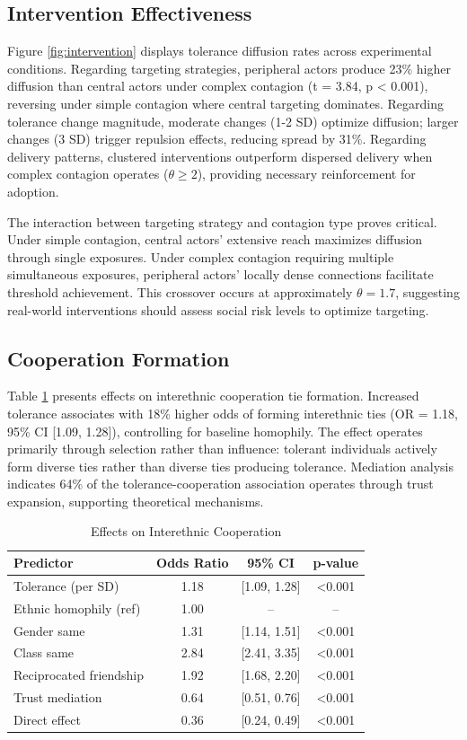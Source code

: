 \documentclass[12pt,a4paper]{article}
\begin{document}
\subsection{Intervention Effectiveness}

Figure \ref{fig:intervention} displays tolerance diffusion rates across experimental conditions. Regarding targeting strategies, peripheral actors produce 23\% higher diffusion than central actors under complex contagion (t = 3.84, p < 0.001), reversing under simple contagion where central targeting dominates. Regarding tolerance change magnitude, moderate changes (1-2 SD) optimize diffusion; larger changes (3 SD) trigger repulsion effects, reducing spread by 31\%. Regarding delivery patterns, clustered interventions outperform dispersed delivery when complex contagion operates ($\theta \geq 2$), providing necessary reinforcement for adoption.

The interaction between targeting strategy and contagion type proves critical. Under simple contagion, central actors' extensive reach maximizes diffusion through single exposures. Under complex contagion requiring multiple simultaneous exposures, peripheral actors' locally dense connections facilitate threshold achievement. This crossover occurs at approximately $\theta = 1.7$, suggesting real-world interventions should assess social risk levels to optimize targeting.

\subsection{Cooperation Formation}

Table \ref{tab:cooperation} presents effects on interethnic cooperation tie formation. Increased tolerance associates with 18\% higher odds of forming interethnic ties (OR = 1.18, 95\% CI [1.09, 1.28]), controlling for baseline homophily. The effect operates primarily through selection rather than influence: tolerant individuals actively form diverse ties rather than diverse ties producing tolerance. Mediation analysis indicates 64\% of the tolerance-cooperation association operates through trust expansion, supporting theoretical mechanisms.

\begin{table}[h]
\centering
\caption{Effects on Interethnic Cooperation}
\label{tab:cooperation}
\begin{tabular}{lccc}
\toprule
Predictor & Odds Ratio & 95\% CI & p-value \\
\midrule
Tolerance (per SD) & 1.18 & [1.09, 1.28] & <0.001 \\
Ethnic homophily (ref) & 1.00 & -- & -- \\
Gender same & 1.31 & [1.14, 1.51] & <0.001 \\
Class same & 2.84 & [2.41, 3.35] & <0.001 \\
Reciprocated friendship & 1.92 & [1.68, 2.20] & <0.001 \\
\midrule
Trust mediation & 0.64 & [0.51, 0.76] & <0.001 \\
Direct effect & 0.36 & [0.24, 0.49] & <0.001 \\
\bottomrule
\end{tabular}
\end{table}
\end{document}
